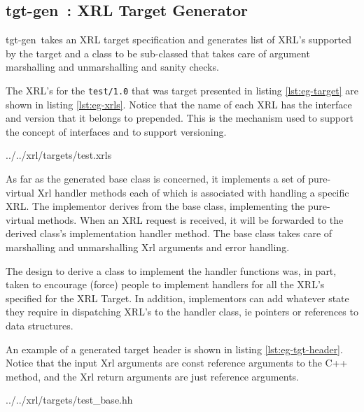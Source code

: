 \documentclass[11pt]{article}
\newcommand{\tgtgen}{{\sf tgt-gen}~}
\begin{document}
\subsection{\tgtgen : XRL Target Generator}

\tgtgen takes an XRL target specification and generates list of XRL's
supported by the target and a class to be sub-classed that takes care
of argument marshalling and unmarshalling and sanity checks.

The XRL's for the {\tt test/1.0} that was target presented in listing
\ref{lst:eg-target} are shown in listing \ref{lst:eg-xrls}.  Notice
that the name of each XRL has the interface and version that it
belongs to prepended.  This is the mechanism used to support the
concept of interfaces and to support versioning.

%
  {../../xrl/targets/test.xrls}

As far as the generated base class is concerned, it implements a set
of pure-virtual Xrl handler methods each of which is associated with
handling a specific XRL.  The implementor derives from the base class,
implementing the pure-virtual methods.  When an XRL request is
received, it will be forwarded to the derived class's implementation
handler method.  The base class takes care of marshalling and
unmarshalling Xrl arguments and error handling.

The design to derive a class to implement the handler functions was,
in part, taken to encourage (force) people to implement handlers for
all the XRL's specified for the XRL Target.  In addition, implementors
can add whatever state they require in dispatching XRL's to the
handler class, ie pointers or references to data structures.

An example of a generated target header is shown in listing
\ref{lst:eg-tgt-header}.  Notice that the input Xrl arguments are
const reference arguments to the C++ method, and the Xrl return
arguments are just reference arguments.

\newpage
%
                {../../xrl/targets/test_base.hh}



\end{document}

